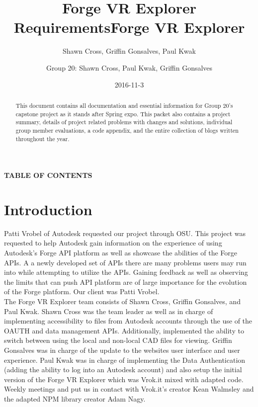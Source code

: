 \documentclass[letterpaper, 10pt, draftclsnofoot, compsoc, onecolumn]{IEEEtran}
\title{Forge VR Explorer Requirements}
\author{Shawn Cross, Griffin Gonsalves, Paul Kwak}
\date{2016-11-3}
\begin{document}
\title{Forge VR Explorer}
\author{Group 20: Shawn Cross, Paul Kwak, Griffin Gonsalves}
\maketitle
\hspace*{\fill}\hspace*{\fill}
\vspace{2cm}
\begin{abstract}
This document contains all documentation and essential information for Group 20's capstone project as it stands after Spring expo. This packet also contains a project summary, details of project related problems with changes and solutions, individual group member evaluations, a code appendix, and the entire collection of blogs written throughout the year. 
\end{abstract}
\IEEEpeerreviewmaketitle

\newpage
{}

{\centering{}\bfseries\color{black}
TABLE OF CONTENTS
\par}

\bigskip

\setcounter{tocdepth}{2}
\renewcommand\contentsname{}
\tableofcontents

\bigskip
\clearpage

\section{Introduction}
 Patti Vrobel of Autodesk requested our project through OSU. This project was requested to help Autodesk gain information on the experience of using Autodesk's Forge API platform as well as showcase the abilities of the Forge APIs. A a newly developed set of APIs there are many problems users may run into while attempting to utilize the APIs. Gaining feedback as well as observing the limits that can push API platform are of large importance for the evolution of the Forge platform. Our client was Patti Vrobel. \\

The Forge VR Explorer team consists of Shawn Cross, Griffin Gonsalves, and Paul Kwak. Shawn Cross was the team leader as well as in charge of implementing accessibility to files from Autodesk accounts through the use of the OAUTH and data management APIs. Additionally, implemented the ability to switch between using the local and non-local CAD files for viewing. Griffin Gonsalves was in charge of the update to the websites user interface and user experience. Paul Kwak was in charge of implementing the Data Authentication (adding the ability to log into an Autodesk account) and also setup the initial version of the Forge VR Explorer which was Vrok.it mixed with adapted code. Weekly meetings and put us in contact with Vrok.it's creator Kean Walmsley and the adapted NPM library creator Adam Nagy.
\end{document}
